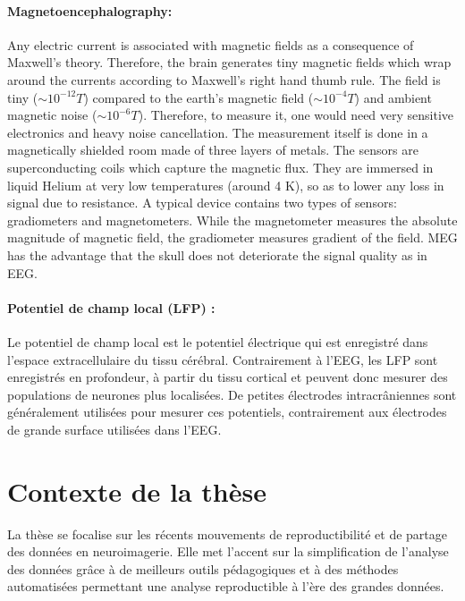 \paragraph{Magnetoencephalography: } Any electric current is associated with magnetic fields as a consequence of Maxwell's theory. 
Therefore, the brain generates tiny magnetic fields which  wrap around the currents according to Maxwell's right hand thumb rule. The field is tiny ($\sim10^{-12}T$) compared to the earth's magnetic field ($\sim10^{-4}T$) and ambient magnetic noise ($\sim10^{-6}T$). Therefore, to measure it, one would need very sensitive electronics and heavy noise cancellation. The measurement itself is done in a magnetically shielded room made of three layers of metals. 
The sensors are superconducting coils which capture the magnetic flux. 
They are immersed in liquid Helium at very low temperatures (around 4 K), so as to lower any loss in signal due to resistance. A typical device contains two types of sensors: gradiometers and magnetometers. While the magnetometer measures the absolute magnitude of magnetic field, the gradiometer measures gradient of the field. \Ac{MEG} has the advantage that the skull does not deteriorate the signal quality as in \ac{EEG}.

\paragraph{Potentiel de champ local (LFP) :}
Le potentiel de champ local est le potentiel électrique qui est enregistré dans l'espace extracellulaire du tissu cérébral. Contrairement à l'EEG, les LFP sont enregistrés en profondeur, à partir du tissu cortical et peuvent donc mesurer des populations de neurones plus localisées. De petites électrodes intracrâniennes sont généralement utilisées pour mesurer ces potentiels, contrairement aux électrodes de grande surface utilisées dans l'EEG.

\section*{Contexte de la thèse}
La thèse se focalise sur les récents mouvements de reproductibilité et de partage des données en neuroimagerie. Elle met l'accent sur la simplification de l'analyse des données grâce à de meilleurs outils pédagogiques et à des méthodes automatisées permettant une analyse reproductible à l'ère des grandes données.


